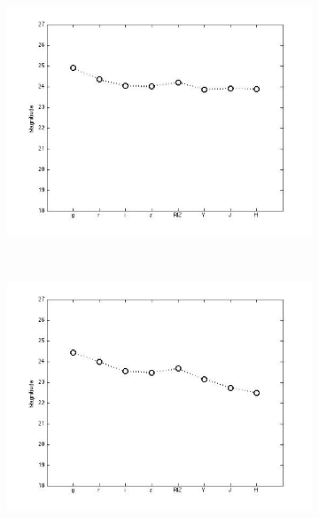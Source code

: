 \documentclass[useAMS,usenatbib,fleqn]{mn2e}
\begin{document}
\begin{figure}
\begin{subfigure}[b]{0.075\textwidth}
                \includegraphics[trim = 35px 15px 50px 25px, clip=true,width=\textwidth]{basis_09.jpg}
        \end{subfigure}
        ~
        \begin{subfigure}[b]{0.075\textwidth}
                \includegraphics[trim = 35px 15px 50px 25px, clip=true,width=\textwidth]{basis_10.jpg}
        \end{subfigure}
        

\end{figure}
\end{document}
